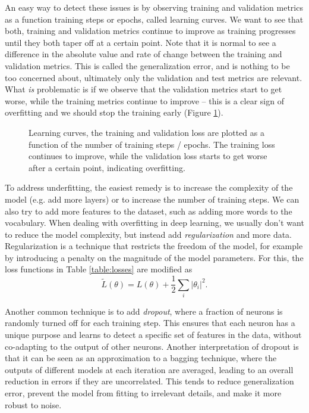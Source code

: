 An easy way to detect these issues is by observing training and validation metrics as a function training steps or epochs, called learning curves.
We want to see that both, training and validation metrics continue to improve as training progresses until they both taper off at a certain point.
Note that it is normal to see a difference in the absolute value and rate of change between the training and validation metrics.
This is called the generalization error, and is nothing to be too concerned about, ultimately only the validation and test metrics are relevant.
What \textit{is} problematic is if we observe that the validation metrics start to get worse, while the training metrics continue to improve -- this is a clear sign of overfitting and we should stop the training early (Figure \ref{fig:learning_curves}).
\begin{figure}
    \centering
    
    \caption{Learning curves, the training and validation loss are plotted as a function of the number of training steps / epochs. The training loss continues to improve, while the validation loss starts to get worse after a certain point, indicating overfitting.}
    \label{fig:learning_curves}
\end{figure}
To address underfitting, the easiest remedy is to increase the complexity of the model (e.g. add more layers) or to increase the number of training steps.
We can also try to add more features to the dataset, such as adding more words to the vocabulary.
When dealing with overfitting in deep learning, we usually don't want to reduce the model complexity, but instead add \textit{regularization} and more data.
Regularization is a technique that restricts the freedom of the model, for example by introducing a penalty on the magnitude of the model parameters.
For this, the loss functions in Table \ref{table:losses} are modified as
\begin{equation}
    \tilde{L}(\theta) = L(\theta) + \frac{1}{2} \sum_{i} |\theta_i|^2.
\end{equation}

Another common technique is to add \textit{dropout}, where a fraction of neurons is randomly turned off for each training step.
This ensures that each neuron has a unique purpose and learns to detect a specific set of features in the data, without co-adapting to the output of other neurons.
Another interpretation of dropout is that it can be seen as an approximation to a bagging technique, where the outputs of different models at each iteration are averaged, leading to an overall reduction in errors if they are uncorrelated.
This tends to reduce generalization error, prevent the model from fitting to irrelevant details, and make it more robust to noise.


